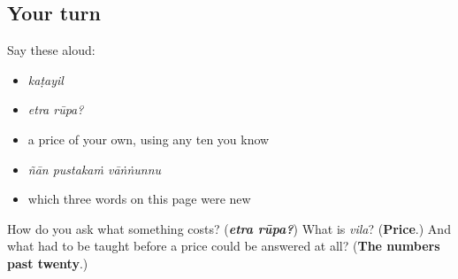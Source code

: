 \subsection*{Your turn}
Say these aloud:

\begin{itemize}
\raggedright
  \item \emph{kaṭayil}
  \item \emph{etra rūpa?}
  \item a price of your own, using any ten you know
  \item \emph{ñān pustakaṁ vāṅṅunnu}
  \item which three words on this page were new
\end{itemize}

\begin{tcolorbox}[breakable,colback=teal!4,colframe=teal!35!black,title={Before you move on}]
How do you ask what something costs? (\emph{\textbf{etra rūpa?}}) What is \emph{vila}? (\textbf{Price}.) And what had to be taught before a price could be answered at all? (\textbf{The numbers past twenty}.)
\end{tcolorbox}
